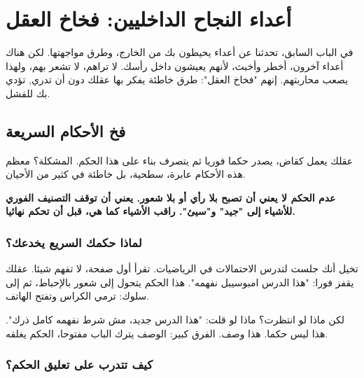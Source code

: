 \documentclass[12pt,a4paper]{book}
\newcommand{\importantAr}[1]{%
	\begin{important}
		\bfseries #1
	\end{important}
}
\begin{document}
\chapter{أعداء النجاح الداخليين: فخاخ العقل}
\label{chap:internal-enemies}
  في الباب السابق، تحدثنا عن أعداء يحيطون بك من الخارج، وطرق مواجهتها. لكن هناك أعداء آخرون، أخطر وأخبث، لأنهم يعيشون داخل رأسك. لا تراهم، لا تشعر بهم، ولهذا يصعب محاربتهم. إنهم "فخاخ العقل": طرق خاطئة يفكر بها عقلك دون أن تدري, تؤدي بك للفشل.

\section{فخ الأحكام السريعة}
\label{sec:non-judging}

عقلك يعمل كقاض، يصدر حكما فوريا ثم يتصرف بناء على هذا الحكم. المشكلة؟ معظم هذه الأحكام عابرة، سطحية، بل خاطئة في كثير من الأحيان.

\importantAr{عدم الحكم لا يعني أن تصبح بلا رأي أو بلا شعور. يعني أن توقف التصنيف الفوري للأشياء إلى "جيد" و"سيئ". راقب الأشياء كما هي، قبل أن تحكم نهائيا.}

\subsection{لماذا حكمك السريع يخدعك؟}

تخيل أنك جلست لتدرس الاحتمالات في الرياضيات. تقرأ أول صفحة، لا تفهم شيئا. عقلك يقفز فورا: "هذا الدرس امبوسيبل نفهمه". هذا الحكم يتحول إلى شعور بالإحباط، ثم إلى سلوك: ترمي الكراس وتفتح الهاتف.

لكن ماذا لو انتظرت؟ ماذا لو قلت: "هذا الدرس جديد، مش شرط نفهمه كامل ذرك". هذا ليس حكما. هذا وصف. الفرق كبير: الوصف يترك الباب مفتوحا، الحكم يغلقه.

\subsection{كيف تتدرب على تعليق الحكم؟}
\end{document}
